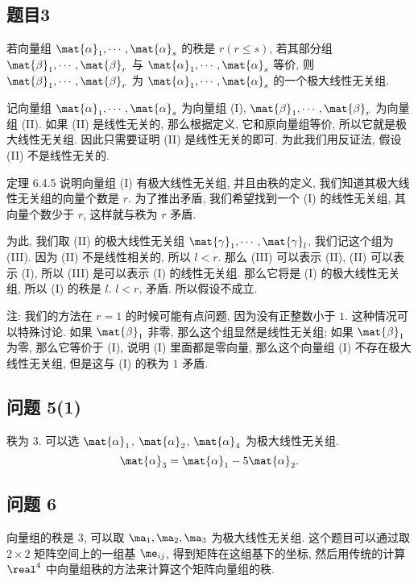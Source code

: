 \newpage
\subsection*{ 题目3 }
\begin{problem*}
若向量组 $\mat{\alpha}_1, \cdots, \mat{\alpha}_s$ 的秩是 $r(r \leqslant s)$, 若其部分组 $\mat{\beta}_1, \cdots, \mat{\beta}_r$ 与 $\mat{\alpha}_1, \cdots, \mat{\alpha}_s$ 等价, 则 $\mat{\beta}_1, \cdots, \mat{\beta}_r$ 为 $\mat{\alpha}_1, \cdots, \mat{\alpha}_s$ 的一个极大线性无关组.
\end{problem*}
\begin{solution}
记向量组 $\mat{\alpha}_1, \cdots, \mat{\alpha}_s$ 为向量组 (I), $\mat{\beta}_1, \cdots, \mat{\beta}_r$ 为向量组 (I\!I). 如果 (I\!I) 是线性无关的, 那么根据定义, 它和原向量组等价, 所以它就是极大线性无关组. 因此只需要证明 (I\!I) 是线性无关的即可. 为此我们用反证法, 假设 (I\!I) 不是线性无关的.

定理 6.4.5 说明向量组 (I) 有极大线性无关组, 并且由秩的定义, 我们知道其极大线性无关组的向量个数是 $r$. 为了推出矛盾, 我们希望找到一个 (I) 的线性无关组, 其向量个数少于 $r$, 这样就与秩为 $r$ 矛盾.

为此, 我们取 (I\!I) 的极大线性无关组 $\mat{\gamma}_1, \cdots, \mat{\gamma}_l$, 我们记这个组为 (I\!I\!I). 因为 (I\!I) 不是线性相关的, 所以 $l < r$. 那么 (I\!I\!I) 可以表示 (I\!I), (I\!I) 可以表示 (I), 所以 (I\!I\!I) 是可以表示 (I) 的线性无关组. 那么它将是 (I) 的极大线性无关组, 所以 (I) 的秩是 $l$. $l < r$, 矛盾. 所以假设不成立.

注: 我们的方法在 $r = 1$ 的时候可能有点问题, 因为没有正整数小于 $1$. 这种情况可以特殊讨论. 如果 $\mat{\beta}_1$ 非零, 那么这个组显然是线性无关组; 如果 $\mat{\beta}_1$ 为零, 那么它等价于 (I), 说明 (I) 里面都是零向量, 那么这个向量组 (I) 不存在极大线性无关组, 但是这与 (I) 的秩为 $1$ 矛盾.
\end{solution}

\subsection*{ 问题 5(1) }
\begin{solution}
秩为 3. 可以选 $\mat{\alpha}_1$, $\mat{\alpha}_2$, $\mat{\alpha}_4$ 为极大线性无关组. 
\[
\mat{\alpha}_3 = \mat{\alpha}_1 - 5\mat{\alpha}_2.
\]
\end{solution}

\subsection*{ 问题 6 }
\begin{solution}
向量组的秩是 3, 可以取 $\ma_1, \ma_2, \ma_3$ 为极大线性无关组. 这个题目可以通过取 $2 \times 2$ 矩阵空间上的一组基 $\me_{ij}$, 得到矩阵在这组基下的坐标, 然后用传统的计算 $\real^4$ 中向量组秩的方法来计算这个矩阵向量组的秩.
\end{solution}

